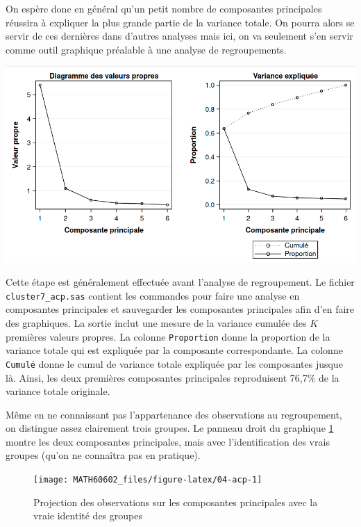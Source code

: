 \documentclass[
  11pt,
  letterpaper,
]{book}
\theoremstyle{definition}
\theoremstyle{definition}
\theoremstyle{definition}
\theoremstyle{remark}
\begin{document}
On espère donc en général qu'un petit nombre de composantes principales réussira à expliquer la plus grande partie de la variance totale. On pourra alors se servir de ces dernières dans d'autres analyses mais ici, on va seulement s'en servir comme outil graphique préalable à une analyse de regroupements.

\begin{center}\includegraphics[width=0.8\linewidth]{figures/04-clustering-e18} \end{center}

Cette étape est généralement effectuée avant l'analyse de regroupement.
Le fichier \texttt{cluster7\_acp.sas} contient les commandes pour faire une analyse en composantes principales et sauvegarder les composantes principales afin d'en faire des graphiques. La sortie inclut une mesure de la variance cumulée des \(K\) premières valeurs propres. La colonne \texttt{Proportion} donne la proportion de la variance totale qui est expliquée par la composante correspondante. La colonne \texttt{Cumulé} donne le cumul de variance totale expliquée par les composantes jusque là. Ainsi, les deux premières composantes principales reproduisent 76,7\% de la variance totale originale.

Même en ne connaissant pas l'appartenance des observations au regroupement, on distingue assez clairement trois groupes. Le panneau droit du graphique \ref{fig:04-acp} montre les deux composantes principales, mais avec l'identification des vrais groupes (qu'on ne connaîtra pas en pratique).

\begin{figure}

{\centering \texttt{[image: MATH60602\_files/figure-latex/04-acp-1]} 

}

\caption{Projection des observations sur les composantes principales avec la vraie identité des groupes}\label{fig:04-acp}
\end{figure}
\end{document}

